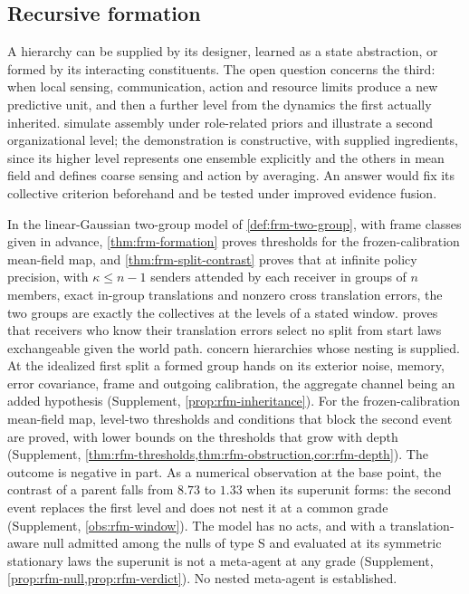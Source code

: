 \subsection{Recursive formation}\label{sec:opn-3}

A hierarchy can be supplied by its designer, learned as a state abstraction, or formed by its interacting constituents. The open question concerns the third: when local sensing, communication, action and resource limits produce a new predictive unit, and then a further level from the dynamics the first actually inherited. \citet{palacios2020markov} simulate assembly under role-related priors and illustrate a second organizational level; the demonstration is constructive, with supplied ingredients, since its higher level represents one ensemble explicitly and the others in mean field and defines coarse sensing and action by averaging. An answer would fix its collective criterion beforehand and be tested under improved evidence fusion.

In the linear-Gaussian two-group model of \cref{def:frm-two-group}, with frame classes given in advance, \cref{thm:frm-formation} proves thresholds for the frozen-calibration mean-field map, and \cref{thm:frm-split-contrast} proves that at infinite policy precision, with $\kappa\le n-1$ senders attended by each receiver in groups of $n$ members, exact in-group translations and nonzero cross translation errors, the two groups are exactly the collectives at the levels of a stated window.  proves that receivers who know their translation errors select no split from start laws exchangeable given the world path.  concern hierarchies whose nesting is supplied. At the idealized first split a formed group hands on its exterior noise, memory, error covariance, frame and outgoing calibration, the aggregate channel being an added hypothesis (Supplement, \cref{prop:rfm-inheritance}). For the frozen-calibration mean-field map, level-two thresholds and conditions that block the second event are proved, with lower bounds on the thresholds that grow with depth (Supplement, \cref{thm:rfm-thresholds,thm:rfm-obstruction,cor:rfm-depth}). The outcome is negative in part. As a numerical observation at the base point, the contrast of a parent falls from $8.73$ to $1.33$ when its superunit forms: the second event replaces the first level and does not nest it at a common grade (Supplement, \cref{obs:rfm-window}). The model has no acts, and with a translation-aware null admitted among the nulls of type S and evaluated at its symmetric stationary laws the superunit is not a meta-agent at any grade (Supplement, \cref{prop:rfm-null,prop:rfm-verdict}). No nested meta-agent is established.

